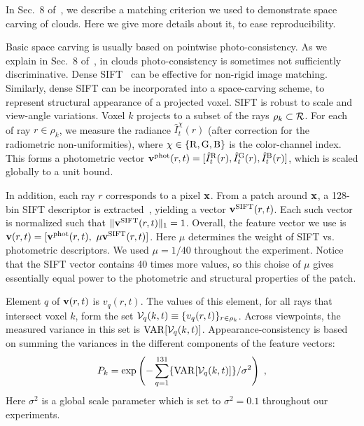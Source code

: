 \documentclass[runningheads]{llncs}
\begin{document}
In Sec.~8 of~\cite{danny2014}, we describe a matching criterion we used to demonstrate space carving of clouds. Here we give more details about it, to ease reproducibility.

Basic space carving is usually based on pointwise photo-consistency. As we explain in Sec.~8 of~\cite{danny2014}, in clouds photo-consistency is sometimes not sufficiently discriminative. Dense SIFT~\cite{liu2008sift} can be effective for non-rigid image matching. Similarly, dense SIFT can be incorporated into a space-carving scheme, to represent structural appearance of a projected voxel. SIFT is robust to scale and view-angle variations.
Voxel $k$ projects to a subset of the rays $\rho_k\subset{\cal R}$.
For each of ray $r\in\rho_k$, we measure the radiance $\hat I_t^{\chi}(r)$ (after correction for the radiometric non-uniformities), where
 $\chi\in\{{\rm R,G,B}\}$ is the color-channel index. This forms a photometric vector ${\bf v}^{\rm phot}(r,t)=[\hat I^{\rm R}_t(r),\hat I^{\rm G}_t(r),\hat I^{\rm B}_t(r)]$, which is scaled globally to a unit bound.

In addition, each ray $r$ corresponds to a pixel ${\bf x}$. From a %
patch around ${\bf x}$, a 128-bin SIFT descriptor is extracted~\cite{lowe1999object}, yielding a vector
${\bf v}^{\rm SIFT}(r,t)$. Each such vector is normalized such that
$\|{\bf v}^{\rm SIFT}(r,t)\|_1=1$. Overall, the feature vector we use is
${\bf v}(r,t)=[{\bf v}^{\rm phot}(r,t), ~\mu{\bf v}^{\rm SIFT}(r,t)]$. Here $\mu$ determines the weight of SIFT vs. photometric descriptors. We used $\mu=1/40$ throughout the experiment. Notice that the SIFT vector contains 40 times more values, so this choise of $\mu$ gives essentially equal power to the photometric and structural properties of the patch.

Element $q$ of ${\bf v}(r,t)$ is $v_q(r,t)$. The values of this element, for all rays that intersect voxel $k$, form the set \mbox{${\cal V}_q(k,t)\equiv\{v_q(r,t)\}_{r\in\rho_k}$}.
Across viewpoints, the measured variance in this set is
${\rm VAR}[{\cal V}_q(k,t)]$.
Appearance-consistency is based on summing the variances in the different components of the feature vectors:
\begin{equation}
 P_k= \exp\left(
         -\sum_{q=1}^{131}\{{\rm VAR}[{\cal V}_q(k,t)]\}/\sigma^2
         \right)
  \;,
 \label{eq:Dist}
\end{equation}
Here $\sigma^2$ is a global scale parameter which is set to $\sigma^2=0.1$ throughout our experiments.

\newpage
 

\end{document}
